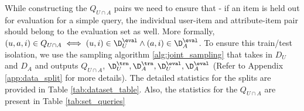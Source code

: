 While constructing the $Q_{U \cap A}$ pairs we need to ensure that - if an item is held out for evaluation for a simple query, the individual user-item and attribute-item pair should belong to the evaluation set as well. More formally, $(u,a,i) \in  Q_{U \cap A} \iff  (u, i) \in \D_U^\eval \wedge (a,i) \in \D_A^\eval$.
To ensure this train/test isolation, we use the sampling algorithm \ref{alg:joint_sampling} that takes in $D_{U}$ and $D_{A}$ and outputs $Q_{U \cap A}$, $\D_U^\trn, \D_A^\trn, \D_U^\eval, \D_A^\eval$ (Refer to Appendix \ref{app:data_split} for more details). The detailed statistics for the splits are provided in Table \ref{tab:dataset_table}. Also, the statistics for the $Q_{U \cap A}$ are present in Table \ref{tab:set_queries} 
\vspace{-3pt}
